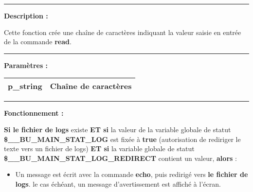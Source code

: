 \documentclass[a4paper,10pt]{article}
\begin{document}

    \par\noindent\rule{\textwidth}{0.4pt}

    \begin{justify}
        \textbf{Description :}

        Cette fonction crée une chaîne de caractères indiquant la valeur saisie en entrée de la commande \textbf{\color{cmds}read}.
    \end{justify}


    \par\noindent\rule{\textwidth}{0.4pt}

    \begin{justify}
        \textbf{Paramètres :}

        \begin{tabular}{|l|l|}
            \hline
            \textbf{\color{vars}p\_string} & Chaîne de caractères\\
            \hline
        \end{tabular}
    \end{justify}


    \par\noindent\rule{\textwidth}{0.4pt}

    \begin{justify}
        \textbf{Fonctionnement :}

        \textbf{\color{cond}Si \color{path}le fichier de logs} existe \textbf{\color{cond}ET si} la valeur de la variable globale de statut \textbf{\color{vars}\$\_\_BU\_MAIN\_STAT\_LOG} est fixée à \textbf{true} (autorisation de rediriger le texte vers un fichier de logs) \textbf{\color{cond}ET si} la variable globale de statut \textbf{\color{vars}\$\_\_BU\_MAIN\_STAT\_LOG\_REDIRECT} contient un valeur, \textbf{\color{cond}alors} :

        \begin{itemize}
            \item
            {
                \begin{justify}
                    Un message est écrit avec la commande \textbf{\color{cmds}echo}, puis redirigé vers \textbf{\color{path}le fichier de logs}. le cas échéant, un message d'avertissement est affiché à l'écran.
                \end{justify}
            }
        \end{itemize}
    \end{justify}
\end{document}

